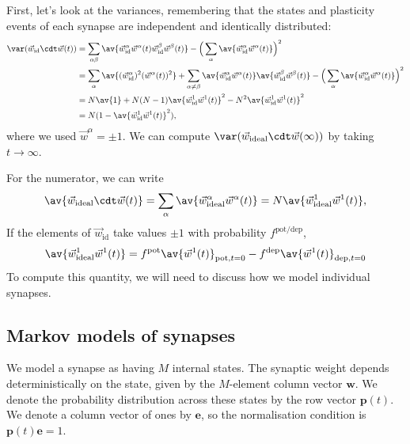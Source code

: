 \documentclass[12pt]{article}
\newcommand{\onev}{\mathbf{e}}
\newcommand{\pr}{\mathbf{p}}
\newcommand{\w}{\mathbf{w}}
\newcommand{\pot}{^{\text{pot}}}
\newcommand{\dep}{^{\text{dep}}}
\newcommand{\potdep}{^{\text{pot/dep}}}
\newcommand{\syn}{\vec{w}}
\newcommand{\synid}{\syn_\text{id}}
\begin{document}
First, let's look at the variances, remembering that the states and plasticity events of each synapse are independent and identically distributed:
%
\begin{equation}\label{eq:noise}
\begin{aligned}
  \var(\synid\cdt\syn(t))
    &= \sum_{\alpha\beta} \av{\synid^\alpha \syn^\alpha(t) \synid^\beta \syn^\beta(t)}
    - \Big(\sum_{\alpha} \av{\synid^\alpha \syn^\alpha(t)} \Big)^2 \\
    &= \sum_{\alpha} \av{(\synid^\alpha)^2(\syn^\alpha(t))^2}
    + \sum_{\alpha\neq\beta} \av{\synid^\alpha\syn^\alpha(t)}\av{\smash{\synid^\beta}\smash{\syn^\beta}(t)}
    - \Big(\sum_{\alpha} \av{\synid^\alpha \syn^\alpha(t)} \Big)^2  \\
    &= N\av{1}
    + N(N-1)\av{\synid^1 \syn^1(t)}^2
    - N^2\av{\synid^1 \syn^1(t)}^2 \\
    &= N(1-\av{\synid^1 \syn^1(t)}^2),
\end{aligned}
\end{equation}
%
where we used $\syn^\alpha=\pm1$.
We can compute $\var(\syn_\text{ideal}\cdt\syn(\infty))$ by taking $t\to\infty$.

For the numerator, we can write
%
\begin{equation}\label{eq:overlapex}
  \av{\syn_\text{ideal}\cdt\syn(t)} = \sum_\alpha\av{\syn^\alpha_\text{ideal}\syn^\alpha(t)}
   = N \av{\syn^1_\text{ideal}\syn^1(t)},
\end{equation}
%
If the elements of $\synid$ take values $\pm1$ with probability $f\potdep$,
%
\begin{equation}\label{eq:overlapone}
  \av{\syn^1_\text{ideal}\syn^1(t)} = f\pot \av{\syn^1(t)}_{\text{pot},t=0} - f\dep \av{\syn^1(t)}_{\text{dep},t=0}
\end{equation}
%
To compute this quantity, we will need to discuss how we model individual synapses.




\subsection{Markov models of synapses}\label{sec:markovsynapse}

We model a synapse as having $M$ internal states.
The synaptic weight depends deterministically on the state, given by the $M$-element column vector $\w$.
We denote the probability distribution across these states by the row vector $\pr(t)$.
We denote a column vector of ones by $\onev$, so the normalisation condition is $\pr(t)\onev=1$.
\end{document}
